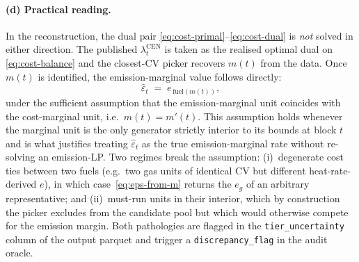 \paragraph{(d) Practical reading.}
In the \cenpipe{} reconstruction, the dual pair
\eqref{eq:cost-primal}--\eqref{eq:cost-dual} is \emph{not} solved in
either direction.  The published $\lambda_t^{\mathrm{CEN}}$ is taken as
the realised optimal dual on \eqref{eq:cost-balance} and the
closest-CV picker recovers $m(t)$ from the data.  Once $m(t)$ is
identified, the emission-marginal value follows directly:
\begin{equation}
  \hat\varepsilon_t \;=\; e_{\,\mathrm{fuel}(m(t))},
  \label{eq:eps-from-m}
\end{equation}
under the sufficient assumption that the emission-marginal unit
coincides with the cost-marginal unit, i.e.\ $m(t)\!=\!m'(t)$.  This
assumption holds whenever the marginal unit is the only generator
strictly interior to its bounds at block $t$ and is what justifies
treating $\hat\varepsilon_t$ as the true emission-marginal rate
without re-solving an emission-LP.  Two regimes break the
assumption: (i)~degenerate cost ties between two fuels (e.g.\ two gas
units of identical CV but different heat-rate-derived $e$), in which
case~\eqref{eq:eps-from-m} returns the $e_g$ of an arbitrary
representative; and (ii)~must-run units in their interior, which by
construction the picker excludes from the candidate pool but which
would otherwise compete for the emission margin.  Both pathologies
are flagged in the
\texttt{tier\_uncertainty} column of the output parquet and trigger a
\texttt{discrepancy\_flag} in the audit oracle.


